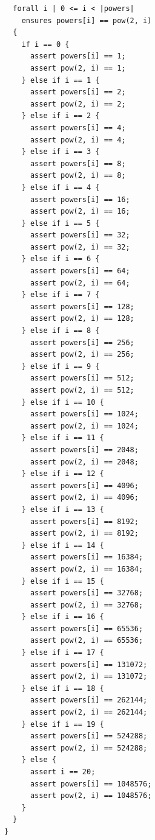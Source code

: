 \documentclass{article}
\begin{document}
\begin{lstlisting}
  forall i | 0 <= i < |powers|
    ensures powers[i] == pow(2, i)
  {
    if i == 0 {
      assert powers[i] == 1;
      assert pow(2, i) == 1;
    } else if i == 1 {
      assert powers[i] == 2;
      assert pow(2, i) == 2;
    } else if i == 2 {
      assert powers[i] == 4;
      assert pow(2, i) == 4;
    } else if i == 3 {
      assert powers[i] == 8;
      assert pow(2, i) == 8;
    } else if i == 4 {
      assert powers[i] == 16;
      assert pow(2, i) == 16;
    } else if i == 5 {
      assert powers[i] == 32;
      assert pow(2, i) == 32;
    } else if i == 6 {
      assert powers[i] == 64;
      assert pow(2, i) == 64;
    } else if i == 7 {
      assert powers[i] == 128;
      assert pow(2, i) == 128;
    } else if i == 8 {
      assert powers[i] == 256;
      assert pow(2, i) == 256;
    } else if i == 9 {
      assert powers[i] == 512;
      assert pow(2, i) == 512;
    } else if i == 10 {
      assert powers[i] == 1024;
      assert pow(2, i) == 1024;
    } else if i == 11 {
      assert powers[i] == 2048;
      assert pow(2, i) == 2048;
    } else if i == 12 {
      assert powers[i] == 4096;
      assert pow(2, i) == 4096;
    } else if i == 13 {
      assert powers[i] == 8192;
      assert pow(2, i) == 8192;
    } else if i == 14 {
      assert powers[i] == 16384;
      assert pow(2, i) == 16384;
    } else if i == 15 {
      assert powers[i] == 32768;
      assert pow(2, i) == 32768;
    } else if i == 16 {
      assert powers[i] == 65536;
      assert pow(2, i) == 65536;
    } else if i == 17 {
      assert powers[i] == 131072;
      assert pow(2, i) == 131072;
    } else if i == 18 {
      assert powers[i] == 262144;
      assert pow(2, i) == 262144;
    } else if i == 19 {
      assert powers[i] == 524288;
      assert pow(2, i) == 524288;
    } else {
      assert i == 20;
      assert powers[i] == 1048576;
      assert pow(2, i) == 1048576;
    }
  }
}
\end{lstlisting}
\end{document}
